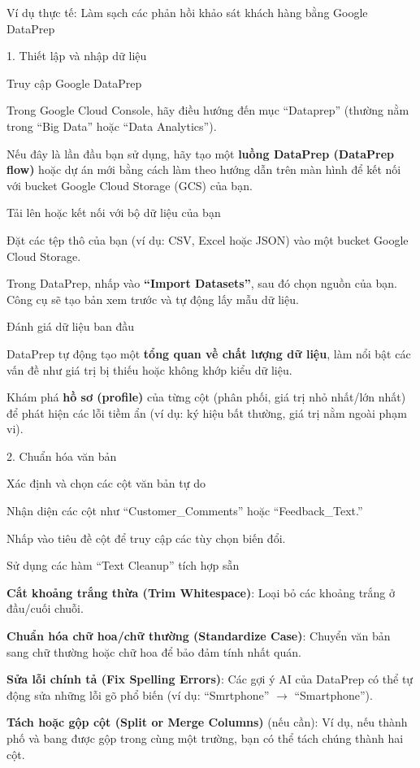 \begin{examplebox}{Ví dụ thực tế: Làm sạch các phản hồi khảo sát khách hàng bằng Google DataPrep}

1. Thiết lập và nhập dữ liệu

Truy cập Google DataPrep

Trong Google Cloud Console, hãy điều hướng đến mục ``Dataprep'' (thường nằm trong ``Big Data'' hoặc ``Data Analytics'').

Nếu đây là lần đầu bạn sử dụng, hãy tạo một \textbf{luồng DataPrep (DataPrep flow)} hoặc dự án mới bằng cách làm theo hướng dẫn trên màn hình để kết nối với bucket Google Cloud Storage (GCS) của bạn.

Tải lên hoặc kết nối với bộ dữ liệu của bạn

Đặt các tệp thô của bạn (ví dụ: CSV, Excel hoặc JSON) vào một bucket Google Cloud Storage.

Trong DataPrep, nhấp vào \textbf{``Import Datasets''}, sau đó chọn nguồn của bạn. Công cụ sẽ tạo bản xem trước và tự động lấy mẫu dữ liệu.

Đánh giá dữ liệu ban đầu

DataPrep tự động tạo một \textbf{tổng quan về chất lượng dữ liệu}, làm nổi bật các vấn đề như giá trị bị thiếu hoặc không khớp kiểu dữ liệu.

Khám phá \textbf{hồ sơ (profile)} của từng cột (phân phối, giá trị nhỏ nhất/lớn nhất) để phát hiện các lỗi tiềm ẩn (ví dụ: ký hiệu bất thường, giá trị nằm ngoài phạm vi).

2. Chuẩn hóa văn bản

Xác định và chọn các cột văn bản tự do

Nhận diện các cột như ``Customer\_Comments'' hoặc ``Feedback\_Text.''

Nhấp vào tiêu đề cột để truy cập các tùy chọn biến đổi.

Sử dụng các hàm ``Text Cleanup'' tích hợp sẵn

\textbf{Cắt khoảng trắng thừa (Trim Whitespace)}: Loại bỏ các khoảng trắng ở đầu/cuối chuỗi.

\textbf{Chuẩn hóa chữ hoa/chữ thường (Standardize Case)}: Chuyển văn bản sang chữ thường hoặc chữ hoa để bảo đảm tính nhất quán.

\textbf{Sửa lỗi chính tả (Fix Spelling Errors)}: Các gợi ý AI của DataPrep có thể tự động sửa những lỗi gõ phổ biến (ví dụ: ``Smrtphone'' \ensuremath{\rightarrow} ``Smartphone'').

\textbf{Tách hoặc gộp cột (Split or Merge Columns)} (nếu cần): Ví dụ, nếu thành phố và bang được gộp trong cùng một trường, bạn có thể tách chúng thành hai cột.


\end{examplebox}

